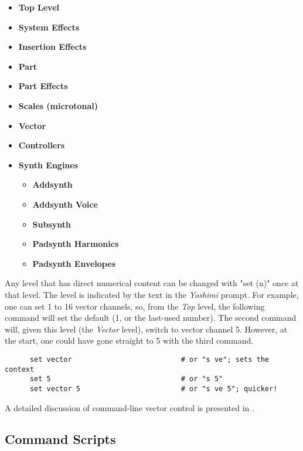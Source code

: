    \begin{itemize}
      \item \textbf{Top Level}
      \item \textbf{System Effects}
      \item \textbf{Insertion Effects}
      \item \textbf{Part}
      \item \textbf{Part Effects}
      \item \textbf{Scales (microtonal)}
      \item \textbf{Vector}
      \item \textbf{Controllers}
      \item \textbf{Synth Engines}
      \begin{itemize}
         \item \textbf{Addsynth}
         \item \textbf{Addsynth Voice}
         \item \textbf{Subsynth}
         \item \textbf{Padsynth Harmonics}
         \item \textbf{Padsynth Envelopes}
      \end{itemize}
   \end{itemize}

   Any level that has direct numerical content can be changed with
   "set (n)" once at that level.  The level is
   indicated by the text in the \textsl{Yoshimi} prompt.
   For example, one can set 1 to 16 vector channels, so, from the
   \textsl{Top} level, the following command
   will set the default (1, or the last-used number).
   The second command will, given this level (the \textsl{Vector} level),
   switch to vector channel 5.
   However, at the start, one could have gone straight to 5 with the third
   command.

   \begin{verbatim}
      set vector                          # or "s ve"; sets the context
      set 5                               # or "s 5"
      set vector 5                        # or "s ve 5"; quicker!
   \end{verbatim}

   A detailed discussion of command-line vector control is presented in
   .

\subsection{Command Scripts}
\label{subsec:command_line_command_scripts}

